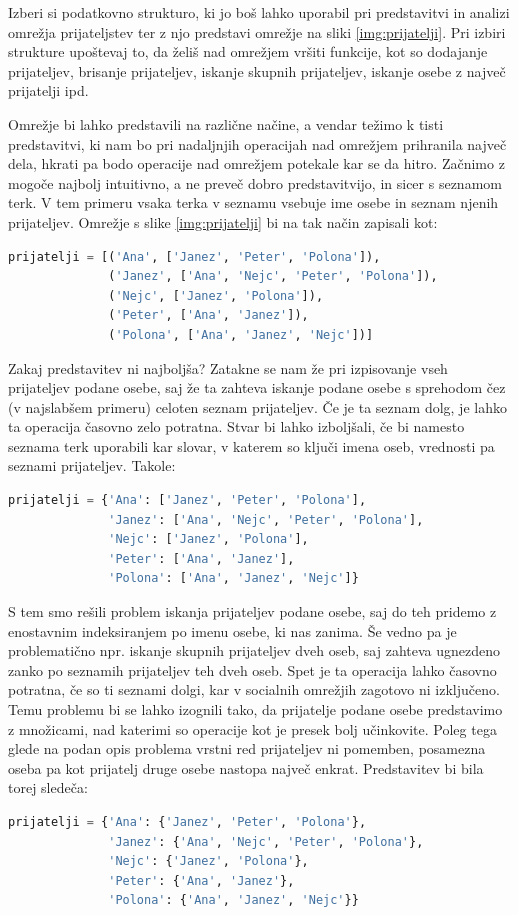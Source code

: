 \begin{zgled}
Izberi si podatkovno strukturo, ki jo boš lahko uporabil pri predstavitvi in analizi omrežja prijateljstev ter z njo predstavi omrežje na sliki \ref{img:prijatelji}. Pri izbiri strukture upoštevaj to, da želiš nad omrežjem vršiti funkcije, kot so dodajanje prijateljev, brisanje prijateljev, iskanje skupnih prijateljev, iskanje osebe z največ prijatelji ipd.
\end{zgled}
\begin{resitev}
Omrežje bi lahko predstavili na različne načine, a vendar težimo k tisti predstavitvi, ki nam bo pri nadaljnjih operacijah nad omrežjem prihranila največ dela, hkrati pa bodo operacije nad omrežjem potekale kar se da hitro. Začnimo z mogoče najbolj intuitivno, a ne preveč dobro predstavitvijo, in sicer s seznamom terk. V tem primeru vsaka terka v seznamu vsebuje ime osebe in seznam njenih prijateljev. Omrežje s slike \ref{img:prijatelji} bi na tak način zapisali kot:
\begin{lstlisting}[language=Python]
prijatelji = [('Ana', ['Janez', 'Peter', 'Polona']),
              ('Janez', ['Ana', 'Nejc', 'Peter', 'Polona']),
              ('Nejc', ['Janez', 'Polona']),
              ('Peter', ['Ana', 'Janez']),
              ('Polona', ['Ana', 'Janez', 'Nejc'])]
\end{lstlisting}
Zakaj predstavitev ni najboljša? Zatakne se nam že pri izpisovanje vseh prijateljev podane osebe, saj že ta zahteva iskanje podane osebe s sprehodom čez (v najslabšem primeru) celoten seznam prijateljev. Če je ta seznam dolg, je lahko ta operacija časovno zelo potratna. Stvar bi lahko izboljšali, če bi namesto seznama terk uporabili kar slovar, v katerem so ključi imena oseb, vrednosti pa seznami prijateljev. Takole: 
\begin{lstlisting}[language=Python]
prijatelji = {'Ana': ['Janez', 'Peter', 'Polona'],
              'Janez': ['Ana', 'Nejc', 'Peter', 'Polona'],
              'Nejc': ['Janez', 'Polona'],
              'Peter': ['Ana', 'Janez'],
              'Polona': ['Ana', 'Janez', 'Nejc']}
\end{lstlisting}
S tem smo rešili problem iskanja prijateljev podane osebe, saj do teh pridemo z enostavnim indeksiranjem po imenu osebe, ki nas zanima. Še vedno pa je problematično npr. iskanje skupnih prijateljev dveh oseb, saj zahteva ugnezdeno zanko po seznamih prijateljev teh dveh oseb. Spet je ta operacija lahko časovno potratna, če so ti seznami dolgi, kar v socialnih omrežjih zagotovo ni izključeno. Temu problemu bi se lahko izognili tako, da prijatelje podane osebe predstavimo z množicami, nad katerimi so operacije kot je presek bolj učinkovite. Poleg tega glede na podan opis problema vrstni red prijateljev ni pomemben, posamezna oseba pa kot prijatelj druge osebe nastopa največ enkrat. Predstavitev bi bila torej sledeča:
\begin{lstlisting}[language=Python]
prijatelji = {'Ana': {'Janez', 'Peter', 'Polona'},
              'Janez': {'Ana', 'Nejc', 'Peter', 'Polona'},
              'Nejc': {'Janez', 'Polona'},
              'Peter': {'Ana', 'Janez'},
              'Polona': {'Ana', 'Janez', 'Nejc'}}
\end{lstlisting}
\end{resitev}

